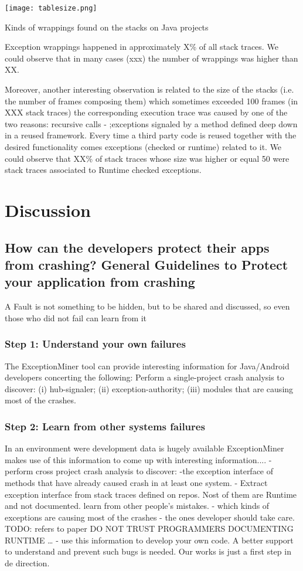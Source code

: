 \documentclass[conference]{IEEEtran}
\begin{document}
\begin{table}
\centering
\texttt{[image: tablesize.png]}
\caption{Kinds of wrappings found on the stacks on Java projects}
\label{fig:wrappingjava}
\end{table}

Exception wrappings happened in approximately X\% of all stack traces. We could observe that in many cases (xxx) the number of wrappings was higher than XX.

Moreover, another interesting observation is related to the size of the stacks (i.e. the number of frames composing them) which sometimes exceeded 100 frames (in XXX stack traces) the corresponding execution trace was caused by one of the two reasons:  recursive calls - ;exceptions signaled by a method defined deep down in a reused framework. Every time a third party code is reused together with the desired functionality comes exceptions (checked or runtime) related to it. We could observe that XX\% of stack traces whose size was higher or equal 50 were stack traces associated to Runtime checked exceptions.

\section{Discussion}
\subsection{How can the developers protect their apps from crashing? General Guidelines to Protect your application from crashing}
A Fault is not something to be hidden, but to be shared and discussed, so even those who did not fail can learn from it
\subsubsection{Step 1: Understand your own failures}
The ExceptionMiner tool can provide interesting information for Java/Android developers concerting the following:
Perform a single-project crash analysis to discover: (i) hub-signaler; (ii) exception-authority; (iii) modules that are causing most of the crashes.

\subsubsection{Step 2: Learn from other systems failures}
In an environment were development data is hugely available ExceptionMiner makes use of this information to come up with interesting information....
- perform cross project crash analysis to discover:
-the exception interface of methods that have already caused crash in at least one system.
- Extract exception interface from stack traces defined on repos. Nost of them are Runtime and not documented. learn from other people's mistakes.
- which kinds of exceptions are causing most of the crashes - the ones developer should take care.
TODO: refers to paper DO NOT TRUST PROGRAMMERS DOCUMENTING RUNTIME …
- use this information to develop your own code.
A better support to understand and prevent such bugs is needed. Our works is
just a first step in de direction.
\end{document}

